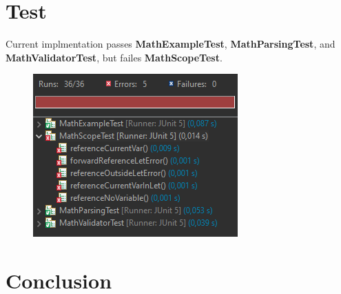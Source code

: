 \documentclass{article}
\begin{document}
\section{Test}

Current implmentation passes \textbf{MathExampleTest}, \textbf{MathParsingTest}, and \textbf{MathValidatorTest}, but failes \textbf{MathScopeTest}.

\begin{figure}[H]
    \centering
    \includegraphics{tests.PNG}
\end{figure}

\section{Conclusion}
\end{document}
